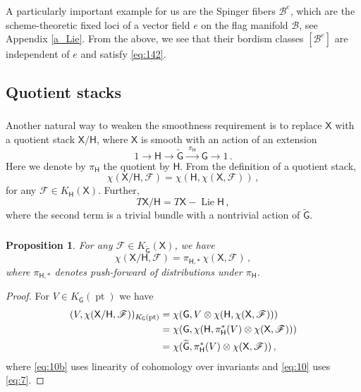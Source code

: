 \documentclass[14pt]{extarticle}
\newcommand{\bG}{\mathsf{G}}
\newcommand{\bH}{\mathsf{H}}
\newcommand{\bX}{\mathsf{X}}
\newcommand{\cF}{\mathscr{F}}
\newcommand{\cB}{\mathscr{B}}
\DeclareMathOperator{\Lie}{Lie}
\DeclareMathOperator{\pt}{pt}
\newtheorem{Proposition}[Lemma]{Proposition}
\theoremstyle{definition}
\begin{document}
\subsubsection{}
A particularly important example for us are the Spinger fibers
$\cB^e$, which are the scheme-theoretic fixed loci of a vector field
$e$ on the flag manifold $\cB$, see Appendix \ref{a_Lie}.
{}From the above, we see that their bordism classes $[\cB^e]$ are
independent of $e$ and satisfy \eqref{eq:142}. 

\subsection{Quotient stacks} 

\subsubsection{}

Another natural way to weaken the smoothness requirement
is to replace $\bX$ with a quotient stack
$\bX/\bH$, where $\bX$ is smooth with an action of an extension
\[
  1 \to \bH \to \widetilde{\bG} \xrightarrow{\,\, \pi_\bH \, \,} \bG \to
1 \,. 
\]
Here we denote by $\pi_\bH$ the quotient by $\bH$. From the definition of a
quotient stack, 
%
\begin{equation}
\chi(\bX/\bH, \cF) = \chi(\bH, \chi(\bX, \cF)) \,,\label{eq:12}
\end{equation}
%
for any $\cF \in K_\bH(\bX)$. 
Further, 
\[
  T \bX/\bH = T \bX - \Lie \bH \,, 
\]
where the second term is a trivial bundle with a nontrivial action of
$\widetilde{\bG}$.

\subsubsection{}


\begin{Proposition}\label{p_stack} For any $\cF \in K_{\widetilde{\bG}}(\bX)$, we
  have 
  \[
    \chi(\bX/\bH, \cF) = \pi_{\bH,*} \, \chi(\bX, \cF) \,,
  \]
  where $\pi_{\bH,*}$ denotes push-forward of distributions under
  $\pi_{\bH}$. 
\end{Proposition}

\begin{proof}
  For $V \in K_\bG(\pt)$ we have
  \begin{align}
  (V, \chi(\bX/\bH, \cF))_{K_\bG(\pt)} &=
                                         \chi(\bG, V \otimes \chi(\bH,
                                         \chi(\bX, \cF))) \notag\\
    &=
      \chi(\bG, \chi(\bH, \pi_\bH^*(V) \otimes  \chi(\bX, \cF))) \label{eq:10b} \\
    &=
      \chi(\widetilde{\bG}, \pi_\bH^*(V) \otimes  \chi(\bX, \cF)) \,, 
\label{eq:10}
  \end{align}
where \eqref{eq:10b} uses linearity of cohomology
over invariants and \eqref{eq:10} uses \eqref{eq:7}. 
\end{proof}
\end{document}

